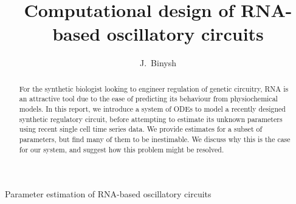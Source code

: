 \documentclass[10pt,journal]{./IEEE_latex_class/IEEEtran}
\begin{document}
%
\title{Computational design of RNA-based oscillatory circuits}

\author{J.~Binysh
        \\ }

%
{Parameter estimation of RNA-based oscillatory circuits}

\maketitle

\thispagestyle{empty}

\newcommand{\MYheader}{\smash{\scriptsize

\hfil\parbox[t][\height][t]{\textwidth}{\centering {\normalsize
Place conference title here}}\hfil\hbox{}}}
\makeatletter

\if@twoside
  \def\ps@headings{%
      \let\@oddfoot\@empty\let\@evenfoot\@empty
      \def\@evenhead{\small\thepage\hfil\leftmark\strut\vadjust{\vskip .1ex\hrule}}%
      \def\@oddhead{\small\rightmark\hfil\thepage\strut\vadjust{\vskip .1ex\hrule}}%
      \let\@mkboth\markboth
    \def\chaptermark##1{%
      \markboth{\scshape%
        \ifnum \c@secnumdepth >\m@ne
            \@chapapp\ \thechapter. \ %
        \fi
        ##1}{}}%
    \def\sectionmark##1{%
      \markright{\scshape%
        \ifnum \c@secnumdepth >\z@
          \thesection. \ %
        \fi
        ##1}}}
\else
  \def\ps@headings{%
    \let\@oddfoot\@empty
    \def\@oddhead{{\slshape\rightmark}\hfil\thepage\ of\ \pageref{LastPage} \strut\vadjust{\vskip .1ex\hrule}}%
    \let\@mkboth\markboth
    \def\chaptermark##1{%
      \markright{\scshape%
        \ifnum \c@secnumdepth >\m@ne
            \@chapapp\ \thechapter. \ %
        \fi
        ##1}}}
\fi
\makeatother

\makeatother

\pagestyle{headings}

\begin{abstract}
For the synthetic biologist looking to engineer regulation of genetic circuitry, RNA is an attractive tool due to the ease of predicting its behaviour from physiochemical models. In this report, we introduce a system of ODEs to model a recently designed synthetic regulatory circuit, before attempting to estimate its unknown parameters using recent single cell time series data. We provide estimates for a subset of parameters, but find many of them to be inestimable. We discuss why this is the case for our system, and suggest how this problem might be resolved.
\end{abstract}
\end{document}
